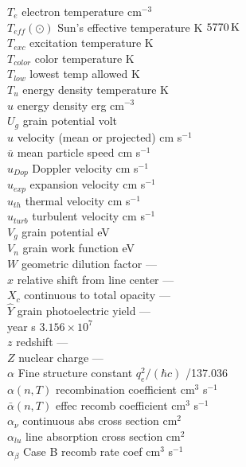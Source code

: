 \begin{tabbing}
$T_e$ \>  electron temperature \>
cm$^{-3}$\\
$T_{eff}(\odot)$ \>  Sun's effective temperature \>  K \>  $5770 {\rm\thinspace K}$\\
$T_{exc}$ \>  excitation
temperature \>  K \> \\
$T_{color}$ \>  color temperature \>  K\\
$T_{low}$ \>  lowest temp allowed \>  K \>   \TempLimitLow\\
$T_{u}$ \>  energy density temperature \>  K\\
$u$ \>  energy density \>  erg cm$^{-3}$\\
$U_g$ \>  grain
potential \>  volt\\
$u$ \>  velocity (mean or projected) \>  cm s$^{-1}$\\
$\bar u$ \>  mean particle speed \>  cm s$^{-1}$\\
$u_{Dop}$ \>  Doppler velocity \>  cm s$^{-1}$\\
$u_{exp}$ \>  expansion
velocity \>  cm s$^{-1}$\\
$u_{th}$ \>  thermal velocity \>  cm s$^{-1}$\\
$u_{turb}$ \>  turbulent velocity \>  cm s$^{-1}$\\
$V_g$ \>  grain potential \>  eV\\
$V_n$ \>  grain work function \>  eV\\
$W$ \>  geometric dilution factor \> ---\\
$x$ \>  relative shift from line center \> ---\\
$X_c$ \>  continuous to total opacity \> ---\\
$\hat Y$ \>
grain photoelectric yield \> ---\\
year \>  \>  s \>  $3.156\times 10^7$\\
$z$ \>  redshift \> ---\\
$Z$ \> nuclear
charge \> ---\\
$\alpha$ \>  Fine structure constant \>  $q_e^2/( {\hbar c} )$ /137.036\\
$\alpha(n, T)$ \>  recombination coefficient \>  cm$^3$ s$^{-1}$\\
$ \bar \alpha (n,T)$ \>
effec recomb coefficient \>  cm$^3$ s$^{-1}$\\
$\alpha_\nu$ \>  continuous abs cross section \>
cm$^2$\\
$\alpha_{lu}$ \>   line absorption cross section \>  cm$^2$\\
$\alpha_\beta$ \>  Case B recomb rate coef \>  cm$^3$
s$^{-1}$\\

\end{tabbing}
